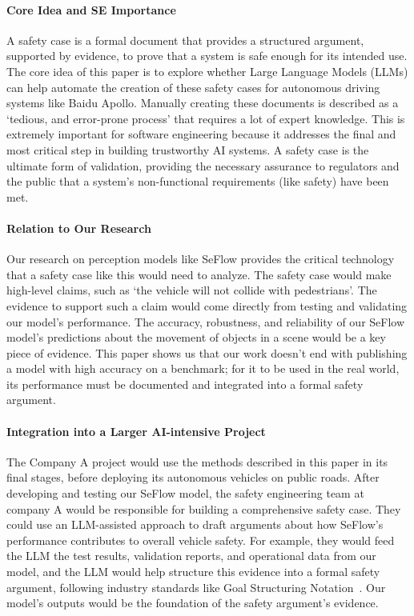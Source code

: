 \documentclass{article}
\begin{document}
\paragraph{Core Idea and SE Importance}
A safety case is a formal document that provides a structured argument, supported by evidence, to prove that a system is safe enough for its intended use. The core idea of this paper is to explore whether Large Language Models (LLMs) can help automate the creation of these safety cases for autonomous driving systems like Baidu Apollo. Manually creating these documents is described as a `tedious, and error-prone process' that requires a lot of expert knowledge. This is extremely important for software engineering because it addresses the final and most critical step in building trustworthy AI systems. A safety case is the ultimate form of validation, providing the necessary assurance to regulators and the public that a system's non-functional requirements (like safety) have been met.

\paragraph{Relation to Our Research}
Our research on perception models like SeFlow provides the critical technology that a safety case like this would need to analyze. The safety case would make high-level claims, such as `the vehicle will not collide with pedestrians'. The evidence to support such a claim would come directly from testing and validating our model's performance. The accuracy, robustness, and reliability of our SeFlow model's predictions about the movement of objects in a scene would be a key piece of evidence. This paper shows us that our work doesn't end with publishing a model with high accuracy on a benchmark; for it to be used in the real world, its performance must be documented and integrated into a formal safety argument.

\paragraph{Integration into a Larger AI-intensive Project}
The Company A project would use the methods described in this paper in its final stages, before deploying its autonomous vehicles on public roads. After developing and testing our SeFlow model, the safety engineering team at company A would be responsible for building a comprehensive safety case. They could use an LLM-assisted approach to draft arguments about how SeFlow's performance contributes to overall vehicle safety. For example, they would feed the LLM the test results, validation reports, and operational data from our model, and the LLM would help structure this evidence into a formal safety argument, following industry standards like Goal Structuring Notation~\cite{SCSC_GSN_Standard}. Our model's outputs would be the foundation of the safety argument's evidence.
\end{document}
